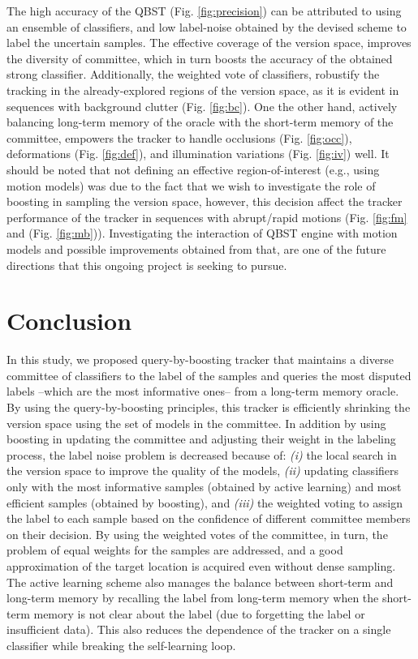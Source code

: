 \documentclass[10pt, conference, compsocconf]{IEEEtran}
\begin{document}
The high accuracy of the QBST (Fig. \ref{fig:precision}) can be attributed to using an ensemble of classifiers, and low label-noise obtained by the devised scheme to label the uncertain samples. The effective coverage of the version space, improves the diversity of committee, which in turn boosts the accuracy of the obtained strong classifier. Additionally, the weighted vote of classifiers, robustify the tracking in the already-explored regions of the version space, as it is evident in sequences with background clutter (Fig. \ref{fig:bc}). One the other hand, actively balancing long-term memory of the oracle with the short-term memory of the committee, empowers the tracker to handle occlusions (Fig. \ref{fig:occ}), deformations (Fig. \ref{fig:def}), and illumination variations (Fig. \ref{fig:iv}) well. It should be noted that not defining an effective region-of-interest (e.g., using motion models) was due to the fact that we wish to investigate the role of boosting in sampling the version space, however, this decision affect the tracker performance of the tracker in sequences with abrupt/rapid motions (Fig. \ref{fig:fm} and (Fig. \ref{fig:mb})). Investigating the interaction of QBST engine with motion models and possible improvements obtained from that, are one of the future directions that this ongoing project is seeking to pursue.

\section{Conclusion}
\label{sec:conclusion}
In this study, we proposed query-by-boosting tracker that maintains a diverse committee of classifiers to the label of the samples and queries the most disputed labels --which are the most informative ones-- from a long-term memory oracle. By using the query-by-boosting principles, this tracker is efficiently shrinking the version space using the set of models in the committee. In addition by using boosting in updating the committee and adjusting their weight in the labeling process, the label noise problem is decreased because of: 
\textit{(i)} the local search in the version space to improve the quality of the models, 
\textit{(ii)} updating classifiers only with the most informative samples (obtained by active learning) and most efficient samples (obtained by boosting), 
and \textit{(iii)} the weighted voting to assign the label to each sample based on the confidence of different committee members on their decision. 
By using the weighted votes of the committee, in turn, the problem of equal weights for the samples are addressed, and a good approximation of the target location is acquired even without dense sampling.  
The active learning scheme also manages the balance between short-term and long-term memory by recalling the label from long-term memory when the short-term memory is not clear about the label (due to forgetting the label or insufficient data). This also reduces the dependence of the tracker on a single classifier while breaking the self-learning loop.  
\end{document}

